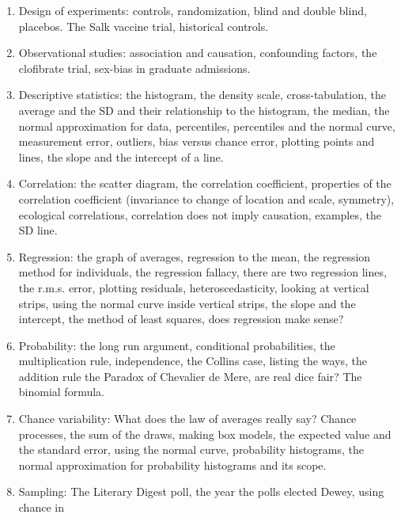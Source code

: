 \documentclass[10pt]{article}
\begin{document}
\begin{enumerate}
\item Design  of  experiments:  controls,  randomization,  blind  and  double  blind,  placebos.  The  
Salk  vaccine  trial,  historical  controls.  
%
\item Observational   studies:   association   and   causation,   confounding   factors,   the   clofibrate  
trial,  sex-bias  in  graduate  admissions.  
%
\item Descriptive   statistics:   the   histogram,   the   density   scale,   cross-tabulation,   the   average  
and   the   SD   and   their   relationship   to   the   histogram,   the   median,   the   normal  
approximation  for  data,  percentiles,  percentiles  and  the  normal  curve,  measurement  
error,  outliers,  bias  versus  chance  error,  plotting  points  and  lines,  the  slope  and  the  
intercept  of  a  line.  
%
\item Correlation:   the   scatter   diagram,   the   correlation   coefficient,   properties   of   the  
correlation   coefficient   (invariance   to   change   of   location   and   scale,   symmetry),  
ecological  correlations,  correlation  does  not  imply  causation,  examples,  the  SD  line.  
%
\item Regression:  the  graph  of  averages,  regression  to  the  mean,  the  regression  method  for  
individuals,   the   regression   fallacy,   there   are   two   regression   lines,   the   r.m.s.   error,  
plotting   residuals,   heteroscedasticity,   looking   at   vertical   strips,   using   the   normal  
curve  inside  vertical  strips,  the  slope  and  the  intercept,  the  method  of  least  squares,  
does  regression  make  sense?  
%  
\item Probability:  the  long  run  argument,  conditional  probabilities,  the  multiplication  rule,  
independence,   the   Collins   case,   listing   the   ways,   the   addition   rule   the   Paradox   of  
Chevalier  de  Mere,  are  real  dice  fair?  The  binomial  formula.  
%  
\item Chance   variability:   What   does   the   law   of   averages   really   say?   Chance   processes,   the  
sum   of   the   draws,   making   box   models,   the   expected   value   and   the   standard   error,  
using   the   normal   curve,   probability   histograms,   the   normal   approximation   for  
probability  histograms  and  its  scope.  
%
\item Sampling:  The  Literary  Digest  poll,  the  year  the  polls  elected  Dewey,  using  chance  in  

\end{enumerate}
\end{document}
